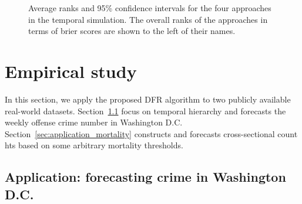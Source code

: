 \documentclass[a4paper,review,12pt,authoryear]{elsarticle}
\begin{document}
\begin{figure}
  \caption{\label{fig:sim_temporal_mcb_prob}Average ranks and 95\% confidence intervals for the four approaches in the temporal simulation. The overall ranks of the approaches in terms of brier scores are shown to the left of their names.}
   \qquad
   \qquad
\end{figure}

\section{Empirical study}

In this section, we apply the proposed DFR algorithm to two publicly available real-world datasets.
Section~\ref{sec:application_crime} focus on temporal hierarchy and forecasts the weekly offense crime number in Washington D.C.
Section~\ref{sec:application_mortality} constructs and forecasts cross-sectional count hts based on some arbitrary mortality thresholds. 

\subsection{Application: forecasting crime in Washington D.C.}
\label{sec:application_crime}
\end{document}
